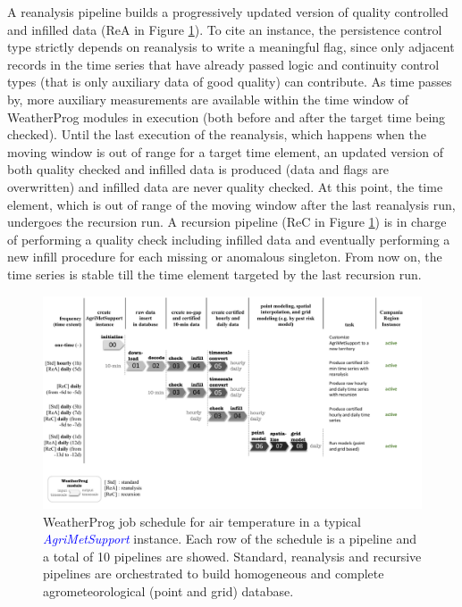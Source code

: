 \documentclass[authoryear,preprint,review,12pt]{elsarticle}
\newcommand{\update}[1]{\emph{\textcolor{blue}{#1}}}
\newcommand{\gci}{\update{AgriMetSupport}\xspace}
\begin{document}
A reanalysis pipeline builds a progressively updated version of quality controlled and infilled data (ReA in Figure \ref{Fig:weatherprog:calls}).
To cite an instance, the persistence control type strictly depends on reanalysis to write a meaningful flag, since only adjacent records in the time series that have already passed logic and continuity control types (that is only auxiliary data of good quality) can contribute. %
As time passes by, more auxiliary measurements are available within the time window of WeatherProg modules in execution (both before and after the target time being checked). 
Until the last execution of the reanalysis, which happens when the moving window is out of range for a target time element, an updated version of both quality checked and infilled data is produced (data and flags are overwritten) and infilled data are never quality checked.
At this point, the time element, which is out of range of the moving window after the last reanalysis run, undergoes the recursion run.
A recursion pipeline (ReC in Figure \ref{Fig:weatherprog:calls}) is in charge of performing a quality check including infilled data and eventually performing a new infill procedure for each missing or anomalous singleton.
From now on, the time series is stable till the time element targeted by the last recursion run.

\begin{figure}
	\centering
	\includegraphics[scale=.4]{figures/WeatherProg-schedule-fig.pdf}
	\caption{WeatherProg job schedule for air temperature in a typical \gci instance.
 Each row of the schedule is a pipeline and a total of 10 pipelines are showed.
 Standard, reanalysis and recursive pipelines are orchestrated to build homogeneous and complete agrometeorological (point and grid) database.}
	\label{Fig:weatherprog:calls}
\end{figure}
\end{document}
